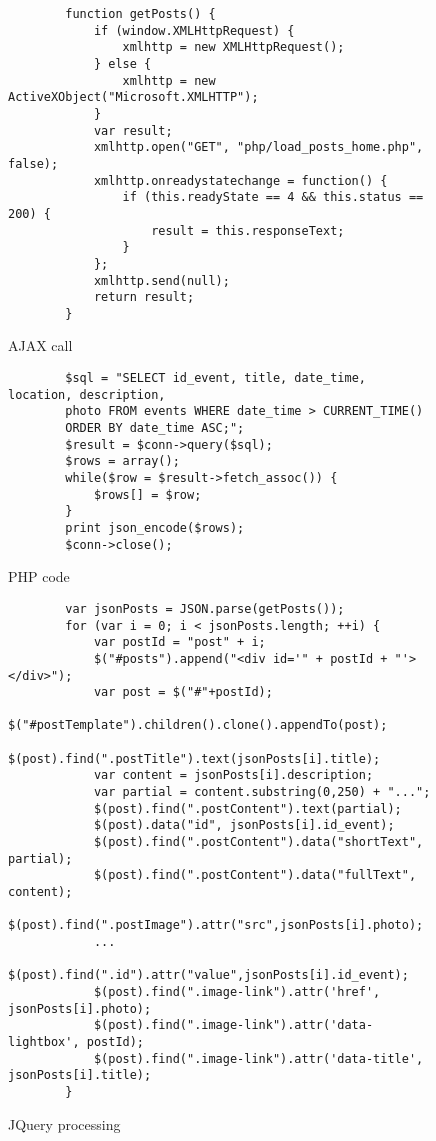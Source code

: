 \documentclass[a4paper]{article}
\begin{document}
	\begin{figure}[H]
		\centering
		\begin{BVerbatim}
		function getPosts() {
			if (window.XMLHttpRequest) {
				xmlhttp = new XMLHttpRequest();
			} else {
				xmlhttp = new ActiveXObject("Microsoft.XMLHTTP");
			}
			var result;
			xmlhttp.open("GET", "php/load_posts_home.php", false);
			xmlhttp.onreadystatechange = function() {
				if (this.readyState == 4 && this.status == 200) {
					result = this.responseText;
				}
			};
			xmlhttp.send(null);
			return result;
		}
		\end{BVerbatim}
		\caption{AJAX call}
		\label{fig:AJAX}
	\end{figure}
	
	\begin{figure}[H]
		\centering
		\begin{BVerbatim}
		$sql = "SELECT id_event, title, date_time, location, description, 
		photo FROM events WHERE date_time > CURRENT_TIME()
		ORDER BY date_time ASC;";
		$result = $conn->query($sql);
		$rows = array();
		while($row = $result->fetch_assoc()) {
			$rows[] = $row;
		}
		print json_encode($rows);
		$conn->close();
		\end{BVerbatim}
		\caption{PHP code}
		\label{fig:PHP}
	\end{figure}

	\begin{figure}[H]
		\centering
		\begin{BVerbatim}
		var jsonPosts = JSON.parse(getPosts());
		for (var i = 0; i < jsonPosts.length; ++i) {
			var postId = "post" + i;
			$("#posts").append("<div id='" + postId + "'></div>");
			var post = $("#"+postId);
			$("#postTemplate").children().clone().appendTo(post);
			$(post).find(".postTitle").text(jsonPosts[i].title);
			var content = jsonPosts[i].description;
			var partial = content.substring(0,250) + "...";
			$(post).find(".postContent").text(partial);
			$(post).data("id", jsonPosts[i].id_event);
			$(post).find(".postContent").data("shortText", partial);
			$(post).find(".postContent").data("fullText", content);
			$(post).find(".postImage").attr("src",jsonPosts[i].photo);
			...
			$(post).find(".id").attr("value",jsonPosts[i].id_event);
			$(post).find(".image-link").attr('href', jsonPosts[i].photo);
			$(post).find(".image-link").attr('data-lightbox', postId);
			$(post).find(".image-link").attr('data-title', jsonPosts[i].title);
		}
		\end{BVerbatim}
		\caption{JQuery processing}
		\label{fig:JQuery}
	\end{figure}
	
\end{document}
